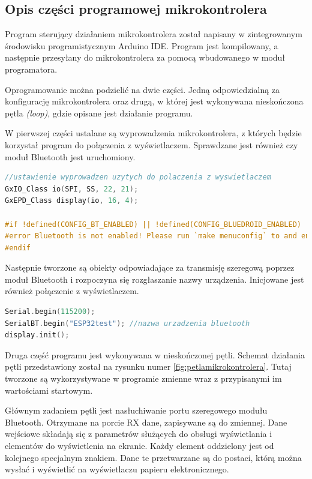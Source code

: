 \documentclass[a4paper,12pt, twoside]{article}
\begin{document}
        \subsection{Opis części programowej mikrokontrolera}
    	Program sterujący działaniem mikrokontrolera został napisany w zintegrowanym środowisku programistycznym Arduino IDE. Program jest kompilowany, a następnie przesyłany do mikrokontrolera za pomocą wbudowanego w moduł programatora.

        Oprogramowanie można podzielić na dwie części. Jedną odpowiedzialną za konfigurację mikrokontrolera oraz drugą, w której jest wykonywana nieskończona pętla \textit{(loop)}, gdzie opisane jest działanie programu.
        
        W pierwszej części ustalane są wyprowadzenia mikrokontrolera, z których będzie korzystał program do połączenia z wyświetlaczem. Sprawdzane jest również czy moduł Bluetooth jest uruchomiony. 
        \begin{lstlisting}[language=C++, caption=Konfiguracja wykorzystanych modułów]
//ustawienie wyprowadzen uzytych do polaczenia z wyswietlaczem
GxIO_Class io(SPI, SS, 22, 21);
GxEPD_Class display(io, 16, 4);

#if !defined(CONFIG_BT_ENABLED) || !defined(CONFIG_BLUEDROID_ENABLED)
#error Bluetooth is not enabled! Please run `make menuconfig` to and enable it
#endif
\end{lstlisting}

        Następnie tworzone są obiekty odpowiadające za transmisję szeregową poprzez moduł Bluetooth i rozpoczyna się rozgłaszanie nazwy urządzenia. Inicjowane jest również połączenie z wyświetlaczem.
        \begin{lstlisting}[language=C++, caption=Konfiguracja wykorzystanych modułów]
Serial.begin(115200);
SerialBT.begin("ESP32test"); //nazwa urzadzenia bluetooth
display.init();
\end{lstlisting}

    	Druga część programu jest wykonywana w nieskończonej pętli. Schemat działania pętli przedstawiony został na rysunku numer \ref{fig:petlamikrokontrolera}. Tutaj tworzone są wykorzystywane w programie zmienne wraz z przypisanymi im wartościami startowym.
    	
    	Głównym zadaniem pętli jest nasłuchiwanie portu szeregowego modułu Bluetooth. Otrzymane na porcie RX dane, zapisywane są do zmiennej. Dane wejściowe składają się z parametrów służących do obsługi wyświetlania i elementów do wyświetlenia na ekranie. Każdy element oddzielony jest od kolejnego specjalnym znakiem. Dane te przetwarzane są do postaci, którą można wysłać i wyświetlić na wyświetlaczu papieru elektronicznego. 
    	
\end{document}
